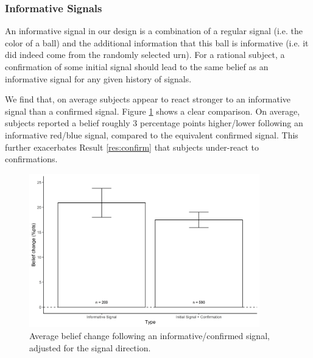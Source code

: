 \documentclass{article}
\begin{document}
\subsubsection{Informative Signals}
An informative signal in our design is a combination of a regular signal (i.e. the color of a ball) and the additional information that this ball is informative (i.e. it did indeed come from the randomly selected urn). For a rational subject, a confirmation of some initial signal should lead to the same belief as an informative signal for any given history of signals.

We find that, on average subjects appear to react stronger to an informative signal than a confirmed signal. Figure \ref{fig:informative_vs_confirmation} shows a clear comparison. On average, subjects reported a belief roughly 3 percentage points higher/lower following an informative red/blue signal, compared to the equivalent confirmed signal. This further exacerbates Result \ref{res:confirm} that subjects under-react to confirmations.

\begin{figure}[!htb]
    \centering
    \includegraphics[width=10cm]{Fig/02_fig_confirm_vs_informative_change.jpg}
    \caption{Average belief change following an informative/confirmed signal, adjusted for the signal direction.}
    \label{fig:informative_vs_confirmation}
\end{figure}
\end{document}
